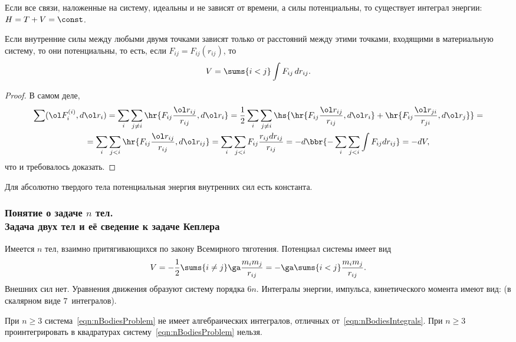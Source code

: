 \documentclass[a4paper,12pt]{article}
\def\F{\ol F}
\def\r{\ol r}
\def\K{\ol K_O}
\def\P{\ol P}
\def\dd{\ddot}
\begin{document}
\begin{imp}
Если все связи, наложенные на систему, идеальны и не
зависят от времени, а силы потенциальны, то существует интеграл
энергии: $H=T+V=\const$.
\end{imp}

\begin{theorem}
Если внутренние силы между любыми двумя точками зависят
только от расстояний между этими точками, входящими в материальную
систему, то они потенциальны, то есть, если $F_{ij}=F_{ij}(r_{ij})$, то
$$V=\sums{i<j}\int F_{ij}\,dr_{ij}.$$
\end{theorem}
\begin{proof}
В самом деле,
\begin{multline*}
\sum(\F_i^{(i)},d\r_i)=
\sum_i\sum_{j\ne i}\hr{F_{ij}\frac{\r_{ij}}{r_{ij}}, d\r_i}=
\frac12\sum_i\sum_{j\ne i}\hs{\hr{F_{ij}\frac{\r_{ij}}{r_{ij}},d\r_i}+\hr{F_{ij}\frac{\r_{ji}}{r_{ji}}, d\r_j}}=\\=
\sum_i\sum_{j<i}\hr{F_{ij}\frac{\r_{ij}}{r_{ij}}, d\r_{ij}}=
\sum_i\sum_{j<i}F_{ij}\frac{r_{ij}dr_{ij}}{r_{ij}}=
-d\bbr{-\sum_i\sum_{j<i}\int F_{ij}dr_{ij}}=
-dV,
\end{multline*}
что и требовалось доказать.
\end{proof}

\begin{imp}
Для абсолютно твердого тела потенциальная энергия
внутренних сил есть константа.
\end{imp}

\subsubsection{Понятие о задаче $n$ тел.\\
Задача двух тел и её сведение к задаче Кеплера}

Имеется $n$ тел, взаимно притягивающихся по закону Всемирного тяготения.
Потенциал системы имеет вид
$$V=-\frac12\sums{i\ne j}\ga\frac{m_im_j}{r_{ij}}=-\ga\sums{i<j}\frac{m_im_j}{r_{ij}}.$$
Внешних сил нет. Уравнения движения
\eqn{\label{eqn:nBodiesProblem}
m_i\dd\r_i=-\frac{\pd V}{\pd \r_i}.}
образуют систему порядка $6n$. Интегралы энергии, импульса,
кинетического момента имеют вид:
\eqn{\label{eqn:nBodiesIntegrals}
H=T+V=h, \quad \P=\const, \quad \K= \const,}
(в скалярном виде $7$~интегралов).

\begin{theorem}[Брунс]
При $n\ge 3$ система~\eqref{eqn:nBodiesProblem} не имеет
алгебраических интегралов, отличных от~\eqref{eqn:nBodiesIntegrals}.
При $n\ge 3$ проинтегрировать в квадратурах систему~\eqref{eqn:nBodiesProblem} нельзя.
\end{theorem}
\end{document}
